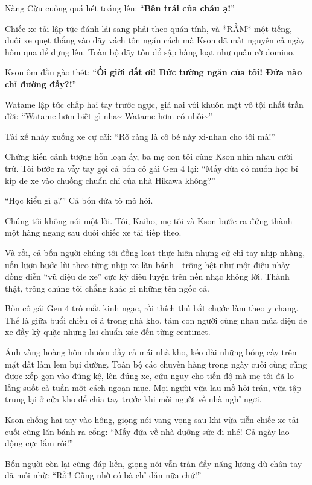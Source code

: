 \documentclass[../main.tex]{subfiles}
\begin{document}
Nàng Cừu cuống quá hét toáng lên: ``\textbf{Bên trái của cháu ạ!}''

Chiếc xe tải lập tức đánh lái sang phải theo quán tính, và *RẦM* một tiếng, đuôi xe quẹt thẳng vào dãy vách tôn ngăn cách mà Kson đã mất nguyên cả ngày hôm qua để dựng lên. Toàn bộ dãy tôn đổ sập hàng loạt như quân cờ domino.

Kson ôm đầu gào thét: ``\textbf{Ối giời đất ơi! Bức tường ngăn của tôi! Đứa nào chỉ đường đấy?!}''

Watame lập tức chắp hai tay trước ngực, giả nai với khuôn mặt vô tội nhất trần đời: ``Watame hơm biết gì nha\~{} Watame hơm có nhỗi\~{}''

Tài xế nhảy xuống xe cự cãi: ``Rõ ràng là cô bé này xi-nhan cho tôi mà!''

Chứng kiến cảnh tượng hỗn loạn ấy, ba mẹ con tôi cùng Kson nhìn nhau cười trừ. Tôi bước ra vẫy tay gọi cả bốn cô gái Gen 4 lại: ``Mấy đứa có muốn học bí kíp de xe vào chuồng chuẩn chỉ của nhà Hikawa không?''

``Học kiểu gì ạ?'' Cả bốn đứa tò mò hỏi.

Chúng tôi không nói một lời. Tôi, Kaiho, mẹ tôi và Kson bước ra đứng thành một hàng ngang sau đuôi chiếc xe tải tiếp theo.

Và rồi, cả bốn người chúng tôi đồng loạt thực hiện những cử chỉ tay nhịp nhàng, uốn lượn bước lùi theo từng nhịp xe lăn bánh - trông hệt như một điệu nhảy đồng diễn ``vũ điệu de xe'' cực kỳ điêu luyện trên nền nhạc không lời. Thành thật, trông chúng tôi chẳng khác gì những tên ngốc cả.

Bốn cô gái Gen 4 trố mắt kinh ngạc, rồi thích thú bắt chước làm theo y chang. Thế là giữa buổi chiều oi ả trong nhà kho, tám con người cùng nhau múa điệu de xe đầy kỳ quặc nhưng lại chuẩn xác đến từng centimet.

\ct

Ánh vàng hoàng hôn nhuốm đầy cả mái nhà kho, kéo dài những bóng cây trên mặt đất lấm lem bụi đường. Toàn bộ các chuyến hàng trong ngày cuối cùng cũng được xếp gọn vào đúng kệ, lên đúng xe, cứu nguy cho tiến độ mà mẹ tôi đã lo lắng suốt cả tuần một cách ngoạn mục. Mọi người vừa lau mồ hôi trán, vừa tập trung lại ở cửa kho để chia tay trước khi mỗi người về nhà nghỉ ngơi.

Kson chống hai tay vào hông, giọng nói vang vọng sau khi vừa tiễn chiếc xe tải cuối cùng lăn bánh ra cổng: ``Mấy đứa về nhà dưỡng sức đi nhé! Cả ngày lao động cực lắm rồi!''

Bốn người còn lại cùng đáp liền, giọng nói vẫn tràn đầy năng lượng dù chân tay đã mỏi nhừ: ``Rồi! Cũng nhờ có bà chỉ dẫn nữa chứ!''
\end{document}
